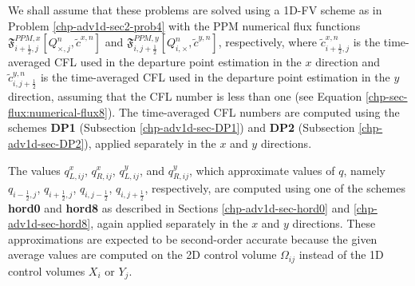 We shall assume that these problems are solved using a 1D-FV scheme as in Problem \ref{chp-adv1d-sec2-prob4}
with the PPM numerical flux functions $\mathfrak{F}_{i+\frac{1}{2},j}^{PPM,x}[Q^n_{\times,j},\tilde{c}^{x,n}]$ and
$\mathfrak{F}_{i,j+\frac{1}{2}}^{PPM,y}[Q^n_{i,\times},\tilde{c}^{y,n}]$, respectively,
where $\tilde{c}^{x,n}_{i+\frac{1}{2},j}$ is the time-averaged CFL used in the departure point estimation in the $x$ direction
and $\tilde{c}^{y,n}_{i,j+\frac{1}{2}}$ is the time-averaged CFL used in the departure point estimation in the $y$ direction,
assuming that the CFL number is less than one (see Equation \eqref{chp-sec-flux:numerical-flux8}).
The time-averaged CFL numbers are computed using the schemes 
\textbf{DP1} (Subsection \ref{chp-adv1d-sec-DP1}) and \textbf{DP2}
(Subsection \ref{chp-adv1d-sec-DP2}), applied separately in the $x$ and $y$ directions.

The values $q_{L,ij}^x$, $q_{R,ij}^x$, $q_{L,ij}^y$, and $q_{R,ij}^y$,
which approximate values of $q$, namely 
$q_{i-\frac{1}{2},j}$, $q_{i+\frac{1}{2},j}$, $q_{i,j-\frac{1}{2}}$, $q_{i,j+\frac{1}{2}}$, respectively,
are computed using one of the schemes \textbf{hord0} and \textbf{hord8} as described
in Sections \ref{chp-adv1d-sec-hord0} and \ref{chp-adv1d-sec-hord8}, again
applied separately in the $x$ and $y$ directions.
These approximations are expected to be
second-order accurate because the given average values are computed on the
2D control volume $\Omega_{ij}$ instead of the 1D control volumes $X_i$ or $Y_j$.

